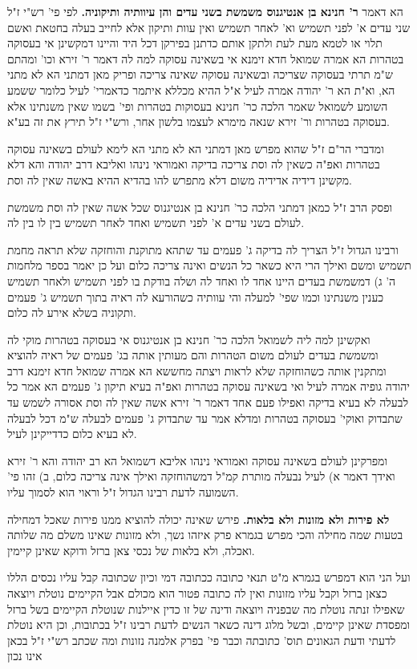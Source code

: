 \documentclass[12pt, openany]{book}
\newcommand{\sethebfont}{
\fontsize{10.5pt}{21.0pt} \selectfont
}
\newcommand{\twocol}[1]{
	{\sethebfont \begin{multicols}{2}
			#1
	\end{multicols}}	
}
\begin{document}
\twocol{הא דאמר \textbf{ר' חנינא בן אנטיגנוס משמשת בשני עדים והן עיוותיה ותיקוניה.}  לפי פי' רש"י ז"ל שני עדים א' לפני תשמיש וא' לאחר תשמיש ואין עוות ותיקון אלא לחייב בעלה בחטאת ואשם תלוי או לטמא מעת לעת ולתקן אותם כדתנן בפירקן דכל היד והיינו דמקשינן אי בעסוקה בטהרות הא אמרה שמואל חדא זימנא אי בשאינה עסוקה למה לה דאמר ר' זירא וכו' ומהתם ש"מ תרתי בעסוקה שצריכה ובשאינה עסוקה שאינה צריכה ופריק מאן דמתני הא לא מתני הא, וא"ת הא ר' יהודה אמרה לעיל א"ל ההיא מכללא איתמר כדאמרי' לעיל כלומר ששמע השומע לשמואל שאמר הלכה כר' חנינא בעסוקות בטהרות ופי' בשמו שאין משנתינו אלא בעסוקה בטהרות ור' זירא שנאה מימרא לעצמו בלשון אחר, ורש"י ז"ל תירץ את זה בע"א.\par  ומדברי הר"ם ז"ל שהוא מפרש מאן דמתני הא לא מתני הא לימא לעולם בשאינה עסוקה בטהרות ואפ"ה כשאין לה וסת צריכה בדיקה ואמוראי נינהו ואליבא דרב יהודה והא דלא מקשינן דידיה אדידיה משום דלא מתפרש להו בהדיא ההיא באשה שאין לה וסת.\par ופסק הרב ז"ל כמאן דמתני הלכה כר' חנינא בן אנטיגנוס שכל אשה שאין לה וסת משמשת לעולם בשני עדים א' לפני תשמיש ואחד לאחר תשמיש בין לו בין לה.\par  ורבינו הגדול ז"ל הצריך לה בדיקה ג' פעמים עד שתהא מתוקנת והוחזקה שלא תראה מחמת תשמיש ומשם ואילך הרי היא כשאר כל הנשים ואינה צריכה כלום ועל כן יאמר בספר מלחמות ה' ג) דמשמשת בעדים היינו אחד לו ואחד לה ושלה בודקת בו לפני תשמיש ולאחר תשמיש כענין משנתינו וכמו שפי' למעלה והי עוותיה כשהורעא לה ראיה בתוך תשמיש ג' פעמים ותקוניה בשלא אירע לה כלום.\par  ואקשינן למה ליה לשמואל הלכה כר' חנינא בן אנטיגנוס אי בעסוקה בטהרות מוקי לה ומשמשת בעדים לעולם משום הטהרות והם מעותין אותה בג' פעמים של ראיה להוציא ומתקנין אותה כשהוחזקה שלא לראות ויצתה מחששא הא אמרה שמואל חדא זימנא דרב יהודה גופיה אמרה לעיל ואי בשאינה עסוקה בטהרות ואפ"ה בעיא תיקון ג' פעמים הא אמר כל לבעלה לא בעיא בדיקה ואפילו פעם אחד דאמר ר' זירא אשה שאין לה וסת אסורה לשמש עד שתבדוק ואוקי' בעסוקה בטהרות ומדלא אמר עד שתבדוק ג' פעמים לבעלה ש"מ דכל לבעלה לא בעיא כלום כדדייקינן לעיל.\par  ומפרקינן לעולם בשאינה עסוקה ואמוראי נינהו אליבא דשמואל הא רב יהודה והא ר' זירא ואידך דאמר א) לעיל נבעלה מותרת קמ"ל דמשהוחזקה ואילך אינה צריכה כלום, ב) זהו פי' השמועה לדעת רבינו הגדול ז"ל וראוי הוא לסמוך עליו. 
\par\textbf{לא פירות ולא מזונות ולא בלאות.}  פירש שאינה יכולה להוציא ממנו פירות שאכל דמחילה בטעות שמה מחילה והכי מפרש בגמרא פרק איזהו נשך, ולא מזונות שאינו משלם מה שלותה ואכלה, ולא בלאות של נכסי צאן ברזל ודוקא שאינן קיימין.\par  ועל הני הוא דמפרש בגמרא מ"ט תנאי כתובה ככתובה דמי וכיון שכתובה קבל עליו נכסים הללו כצאן ברזל וקבל עליו מזונות ואין לה כתובה פטור הוא מכולם אבל הקיימים נוטלת ויוצאה שאפילו זנתה נוטלת מה שבפניה ויוצאה ודינה של זו כדין איילנות שנוטלת הקיימים בשל ברזל ומפסדת שאינן קיימים, ובשל מלוג דינה כשאר הנשים לדעת רבינו ז"ל בכתובות, וכן היא נוטלת לדעתי ודעת הגאונים תוס' כתובתה וכבר פי' בפרק אלמנה נזונות ומה שכתב רש"י ז"ל בכאן אינו נכון 
}
\end{document}
